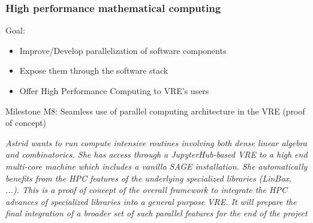 \documentclass{beamer}
\begin{document}
\begin{frame}
  \frametitle{High performance mathematical computing}
  \begin{block}
    {Goal:}
    \begin{itemize}
    \item Improve/Develop parallelization of software components
    \item Expose them through the software stack
    \item Offer High Performance Computing to VRE's users
    \end{itemize}
  \end{block}

  \begin{block}
      {Milestone M8: Seamless use of parallel computing architecture in the VRE (proof of concept)}

{\footnotesize  \textit{Astrid wants to run compute intensive routines involving both dense linear algebra and combinatorics. She has access through a JupyterHub-based VRE to a high end multi-core machine which includes a vanilla SAGE installation.
She automatically benefits from the HPC features of the underlying specialized
libraries (LinBox, ...). This is a proof of concept of the overall framework to
integrate the HPC advances of specialized libraries into a general purpose
VRE. It will prepare the final integration of a broader set of such parallel
features for the end of the project}
  }

  \end{block}
\end{frame}


\end{document}
